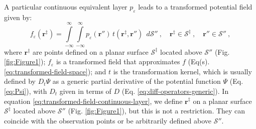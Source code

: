 A particular continuous equivalent layer 
$p_{\varepsilon}$ leads to a transformed potential field given by:
\begin{equation}
	f_{\varepsilon}(\mathbf{r}^{\ddagger})
	= \int\limits_{-\infty}^{\infty}\int\limits_{-\infty}^{\infty}
	p_{\varepsilon}(\mathbf{r}'') \, t(\mathbf{r}^{\ddagger}, \mathbf{r}'') \:\: d\mathcal{S}'' \: , 
	\quad \mathbf{r}^{\ddagger} \in \mathcal{S}^{\ddagger} \: ,
	\quad \mathbf{r}'' \in \mathcal{S}'' \: ,
	\label{eq:transformed-field-continuous-layer}
\end{equation}
where $\mathbf{r}^{\ddagger}$ are points defined on a planar surface $\mathcal{S}^{\ddagger}$ located above 
$\mathcal{S}''$ (Fig. \ref{fig:Figure1}); 
$f_{\varepsilon}$ is a transformed field that approximates $f$ (Eq(s). \ref{eq:transformed-field-space}); and
$t$ is the transformation kernel, which is usually defined by $D_{t} \Psi$ as a generic partial 
derivative of the potential function $\Psi$ (Eq. \ref{eq:Psi}), with $D_{t}$ given in terms of 
$D$ (Eq. \ref{eq:diff-operators-generic}).
In equation \ref{eq:transformed-field-continuous-layer}, we define $\mathbf{r}^{\ddagger}$ on 
a planar surface $\mathcal{S}^{\ddagger}$ located above $\mathcal{S}''$ (Fig. \ref{fig:Figure1}), but this is not a 
restriction. They can coincide with the observation points or be arbitrarily defined above $\mathcal{S}''$.
